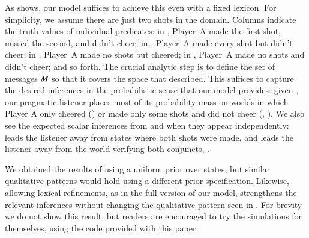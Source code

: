 \documentclass[leqno,12pt]{article}
\begin{document}
As  shows, our model suffices to achieve this
even with a fixed lexicon. For simplicity, we assume there are just
two shots in the domain. Columns indicate the truth values of
individual predicates: in , Player~A made the first
shot, missed the second, and didn't cheer; in ,
Player~A made every shot but didn't cheer; in , Player~A made
no shots but cheered; in \world{$\bullet$}, Player~A made no shots and
didn't cheer; and so forth. The crucial analytic step is to define the
set of messages $M$ so that it covers the space that
\citeauthor{Sauerland01} described. This suffices to capture the
desired inferences in the probabilistic sense that our model provides:
given , our pragmatic listener
 places most of its probability mass on worlds in
which Player A only cheered () or made only some shots and
did not cheer (, ). We also see the
expected scalar inferences from  and  when they
appear independently:  leads
the listener away from states where both shots were made, and
 leads the listener away from
the world verifying both conjuncts, .

We obtained the results of  using a uniform
prior over states, but similar qualitative patterns would hold using a
different prior specification.  Likewise, allowing lexical
refinements, as in the full version of our model, strengthens the
relevant inferences without changing the qualitative pattern seen in
. For brevity we do not show this result, but
readers are encouraged to try the simulations for themselves, using
the code provided with this paper.%
  
\end{document}
